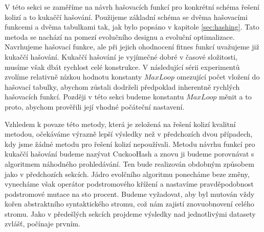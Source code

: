 V této sekci se zaměříme na návrh hašovacích funkcí pro konkrétní schéma řešení kolizí a to kukaččí hašování. Použijeme základní schéma
se dvěma hašovacími funkcemi a dvěma tabulkami tak, jak bylo popsáno v kapitole \ref{sec:hashing}. Tato metoda se nachází na pomezí
evolučního designu a evoluční optimalizace. Navrhujeme hašovací funkce, ale při jejich ohodnocení fitnes funkcí uvažujeme již kukaččí
hašování. Kukaččí hašování je vyjímečné dobré v časové složitosti, musíme však dbát rychlost celé konstrukce. V následující sérii 
experimentů zvolíme relativně nízkou hodnotu konstanty $MaxLoop$ omezující počet vložení do hašovací tabulky, abychom zůstali dodrželi
předpoklad inherentně rychlých hašovacích funkcí. Později v této sekci budeme konstantu $MaxLoop$ měnit a to proto, abychom prověřili
její vhodné počáteční nastavení. 

Vzhledem k povaze této metody, která je zeložená na řešení kolizí kvalitní metodou, očekáváme výrazně lepší výsledky než v předchozích dvou
případech, kdy jsme žádné metodu pro řešení kolizí nepoužívali. Metodu návrhu funkcí pro kukaččí hašování budeme nazývat CuckooHash a
znovu ji budeme porovnávat s algoritmem náhodného prohledávání. Ten bude realizován obdobným způsobem jako v předchozích sekcích. Jádro
evolčního algoritmu ponecháme beze změny, vynecháme však operátor podstromového křížení a nastavíme pravděpodobnost podstromové mutace
na sto procent. Budeme vyžadovat, aby byl mutován vždy kořen abstraktního syntaktického stromu, což nám zajistí znovuobnovení celého stromu.
Jako v předešlých sekcích projdeme výsledky nad jednotlivými datasety zvlášť, počínaje prvním.

